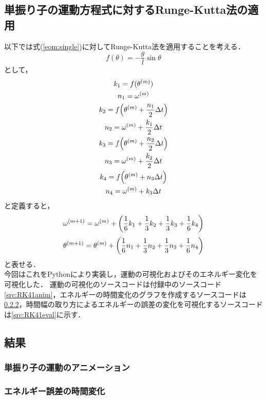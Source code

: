 \documentclass[a4paper,11pt]{jsarticle}
\begin{document}
\subsection{単振り子の運動方程式に対するRunge-Kutta法の適用}
以下では式(\ref{eom:single})に対してRunge-Kutta法を適用することを考える．
\begin{equation}
  f(\theta) = -\dfrac{g}{l}\sin{\theta}
\end{equation}
として，
\begin{gather}
  k_1 = f(\theta^{(m)}) \\
  n_1 = \omega^{(m)} \\
  k_2 = f\qty(\theta^{(m)}+\dfrac{n_1}{2}\Delta t) \\
  n_2 = \omega^{(m)} + \dfrac{k_1}{2}\Delta t \\
  k_3 = f\qty(\theta^{(m)}+\dfrac{n_2}{2}\Delta t) \\
  n_3 = \omega^{(m)} + \dfrac{k_2}{2}\Delta t \\
  k_4 = f\qty(\theta^{(m)} + n_3 \Delta t) \\
  n_4 = \omega^{(m)} + k_3 \Delta t
\end{gather}
と定義すると，
\begin{equation}
  \omega^{(m+1)} = \omega^{(m)} + \qty(\dfrac{1}{6}k_1+\dfrac{1}{3}k_2+\dfrac{1}{3}k_3+\dfrac{1}{6}k_4)
\end{equation}
\begin{equation}
  \theta^{(m+1)} = \theta^{(m)} + \qty(\dfrac{1}{6}n_1+\dfrac{1}{3}n_2+\dfrac{1}{3}n_3+\dfrac{1}{6}n_4)
\end{equation}
と表せる．\\
今回はこれをPythonにより実装し，運動の可視化およびそのエネルギー変化を可視化した．
運動の可視化のソースコードは付録中のソースコード\ref{src:RK41anim}，エネルギーの時間変化のグラフを作成するソースコードは\ref{}，時間幅の取り方によるエネルギーの誤差の変化を可視化するソースコードは\ref{src:RK41eval}に示す．\\

\newpage
\subsection{結果}
\subsubsection{単振り子の運動のアニメーション}

\subsubsection{エネルギー誤差の時間変化}
\end{document}
